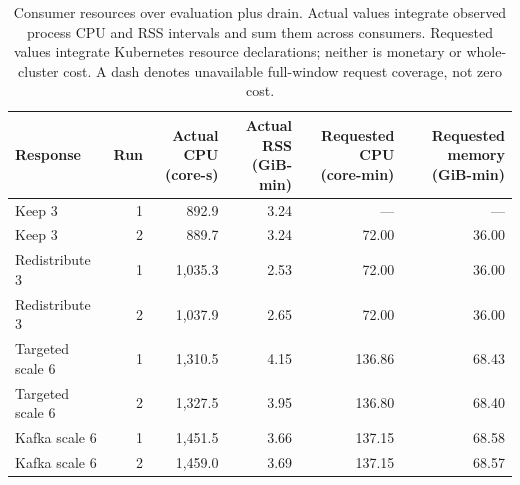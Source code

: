\begin{table}[!htbp]
\centering\small
\setlength{\tabcolsep}{3pt}
\renewcommand{\arraystretch}{1.12}
\begin{tabular}{@{}lrrrrr@{}}
\toprule
Response & Run & \shortstack{Actual CPU\\(core-s)} & \shortstack{Actual RSS\\(GiB-min)} & \shortstack{Requested CPU\\(core-min)} & \shortstack{Requested memory\\(GiB-min)}\\
\midrule
Keep 3 & 1 & 892.9 & 3.24 & --- & ---\\
Keep 3 & 2 & 889.7 & 3.24 & 72.00 & 36.00\\
Redistribute 3 & 1 & 1,035.3 & 2.53 & 72.00 & 36.00\\
Redistribute 3 & 2 & 1,037.9 & 2.65 & 72.00 & 36.00\\
Targeted scale 6 & 1 & 1,310.5 & 4.15 & 136.86 & 68.43\\
Targeted scale 6 & 2 & 1,327.5 & 3.95 & 136.80 & 68.40\\
Kafka scale 6 & 1 & 1,451.5 & 3.66 & 137.15 & 68.58\\
Kafka scale 6 & 2 & 1,459.0 & 3.69 & 137.15 & 68.57\\
\bottomrule
\end{tabular}
\caption{Consumer resources over evaluation plus drain. Actual values integrate observed process CPU and RSS intervals and sum them across consumers. Requested values integrate Kubernetes resource declarations; neither is monetary or whole-cluster cost. A dash denotes unavailable full-window request coverage, not zero cost.}
\label{tab:twelve-partition-resources}
\end{table}
